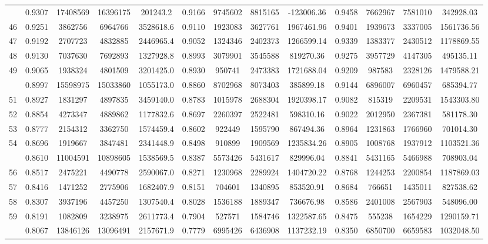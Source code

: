 \documentclass[
  12pt,
]{article}
\begin{document}
\begin{longtable}[t]{lcccccccccccc}
\addlinespace
45 & 0.9307 & 17408569 & 16396175 & 201243.2 & 0.9166 & 9745602 & 8815165 & -123006.36 & 0.9458 & 7662967 & 7581010 & 342928.03\\
46 & 0.9251 & 3862756 & 6964766 & 3528618.6 & 0.9110 & 1923083 & 3627761 & 1967461.96 & 0.9401 & 1939673 & 3337005 & 1561736.56\\
47 & 0.9192 & 2707723 & 4832885 & 2446965.4 & 0.9052 & 1324346 & 2402373 & 1266599.14 & 0.9339 & 1383377 & 2430512 & 1178869.55\\
48 & 0.9130 & 7037630 & 7692893 & 1327928.8 & 0.8993 & 3079901 & 3545588 & 819270.36 & 0.9275 & 3957729 & 4147305 & 495135.11\\
49 & 0.9065 & 1938324 & 4801509 & 3201425.0 & 0.8930 & 950741 & 2473383 & 1721688.04 & 0.9209 & 987583 & 2328126 & 1479588.21\\
\addlinespace
50 & 0.8997 & 15598975 & 15033860 & 1055173.0 & 0.8860 & 8702968 & 8073403 & 385899.18 & 0.9144 & 6896007 & 6960457 & 685394.77\\
51 & 0.8927 & 1831297 & 4897835 & 3459140.0 & 0.8783 & 1015978 & 2688304 & 1920398.17 & 0.9082 & 815319 & 2209531 & 1543303.80\\
52 & 0.8854 & 4273347 & 4889862 & 1177832.6 & 0.8697 & 2260397 & 2522481 & 598310.16 & 0.9022 & 2012950 & 2367381 & 581178.30\\
53 & 0.8777 & 2154312 & 3362750 & 1574459.4 & 0.8602 & 922449 & 1595790 & 867494.36 & 0.8964 & 1231863 & 1766960 & 701014.30\\
54 & 0.8696 & 1919667 & 3847481 & 2341448.9 & 0.8498 & 910899 & 1909569 & 1235834.26 & 0.8905 & 1008768 & 1937912 & 1103521.36\\
\addlinespace
55 & 0.8610 & 11004591 & 10898605 & 1538569.5 & 0.8387 & 5573426 & 5431617 & 829996.04 & 0.8841 & 5431165 & 5466988 & 708903.04\\
56 & 0.8517 & 2475221 & 4490778 & 2590067.0 & 0.8271 & 1230968 & 2289924 & 1404720.22 & 0.8768 & 1244253 & 2200854 & 1187869.03\\
57 & 0.8416 & 1471252 & 2775906 & 1682407.9 & 0.8151 & 704601 & 1340895 & 853520.91 & 0.8684 & 766651 & 1435011 & 827538.62\\
58 & 0.8307 & 3937196 & 4457250 & 1307540.4 & 0.8028 & 1536188 & 1889347 & 736676.98 & 0.8586 & 2401008 & 2567903 & 548096.00\\
59 & 0.8191 & 1082809 & 3238975 & 2611773.4 & 0.7904 & 527571 & 1584746 & 1322587.65 & 0.8475 & 555238 & 1654229 & 1290159.71\\
\addlinespace
60 & 0.8067 & 13846126 & 13096491 & 2157671.9 & 0.7779 & 6995426 & 6436908 & 1137232.19 & 0.8350 & 6850700 & 6659583 & 1032048.50\\

\end{longtable}
\end{document}

